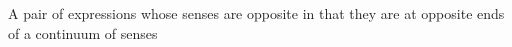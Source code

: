 A pair of expressions whose senses are opposite in that they are at opposite ends of a continuum of senses
